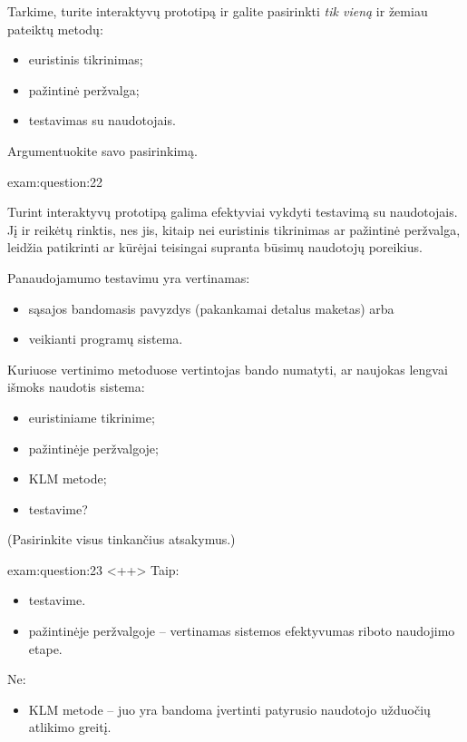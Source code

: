 \begin{question}{%
  Tarkime, turite interaktyvų prototipą ir galite pasirinkti \emph{tik
  vieną} ir žemiau pateiktų metodų:
  \begin{itemize}
    \item euristinis tikrinimas;
    \item pažintinė peržvalga;
    \item testavimas su naudotojais.
  \end{itemize}
  Argumentuokite savo pasirinkimą.
  }{exam:question:22}

  Turint interaktyvų prototipą galima efektyviai vykdyti testavimą
  su naudotojais. Jį ir reikėtų rinktis, nes jis, kitaip nei 
  euristinis tikrinimas ar pažintinė peržvalga, leidžia patikrinti
  ar kūrėjai teisingai supranta būsimų naudotojų poreikius.

  Panaudojamumo testavimu yra vertinamas\cite[8]{skaidres-8}:
  \begin{itemize}
    \item sąsajos bandomasis pavyzdys (pakankamai detalus maketas) arba
    \item veikianti programų sistema.
  \end{itemize}
\end{question}

\begin{question}{%
  Kuriuose vertinimo metoduose vertintojas bando numatyti, ar naujokas
  lengvai išmoks naudotis sistema:
  \begin{itemize}
    \item euristiniame tikrinime;
    \item pažintinėje peržvalgoje;
    \item KLM metode;
    \item testavime?
  \end{itemize}
  (Pasirinkite visus tinkančius atsakymus.)
  }{exam:question:23}
  <++>
  Taip:
  \begin{itemize}
    \item testavime.
    \item pažintinėje peržvalgoje – vertinamas sistemos efektyvumas riboto
      naudojimo etape.
  \end{itemize}

  Ne:
  \begin{itemize}
    \item KLM metode – juo yra bandoma įvertinti patyrusio naudotojo
      užduočių atlikimo greitį.
  \end{itemize}
\end{question}

